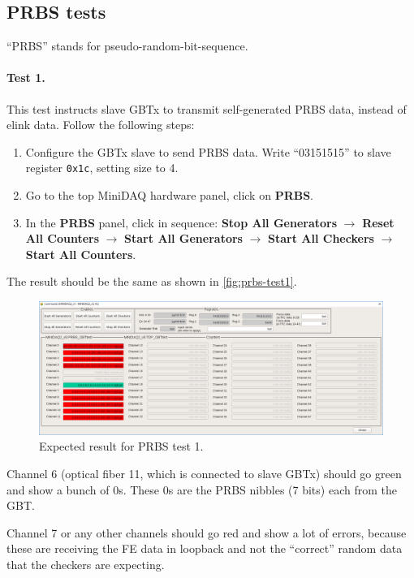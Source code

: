 \subsection{PRBS tests}
``PRBS'' stands for pseudo-random-bit-sequence.

\paragraph{Test 1.}
This test instructs slave GBTx to transmit self-generated PRBS data, instead of
elink data.
Follow the following steps:
\begin{enumerate}
    \item Configure the GBTx slave to send PRBS data. Write ``03151515'' to
        slave register \texttt{0x1c}, setting size to 4.
    \item Go to the top MiniDAQ hardware panel, click on \textbf{PRBS}.
    \item In the \textbf{PRBS} panel, click in sequence:
        \textbf{Stop All Generators} $\to$ \textbf{Reset All Counters} $\to$
        \textbf{Start All Generators} $\to$ \textbf{Start All Checkers} $\to$
        \textbf{Start All Counters}.
\end{enumerate}

The result should be the same as shown in \autoref{fig:prbs-test1}.

\begin{figure}[ht]
    \centering
    \includegraphics[width=\textwidth]{res/prbs_test1.png}
    \caption{Expected result for PRBS test 1.}
    \label{fig:prbs-test1}
\end{figure}

\begin{leftbar}
    Channel 6 (optical fiber 11, which is connected to slave GBTx) should go
    green and show a bunch of 0s.
    These 0s are the PRBS nibbles (7 bits) each from the GBT.
\end{leftbar}

\begin{leftbar}
    Channel 7 or any other channels should go red and show a lot of errors,
    because these are receiving the FE data in loopback and not the ``correct''
    random data that the checkers are expecting.
\end{leftbar}

